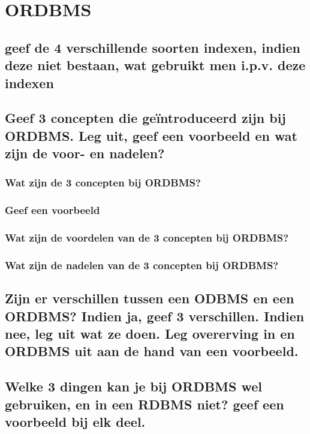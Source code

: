 \newpage

\section{ORDBMS}
\subsection{geef de 4 verschillende soorten indexen, indien deze niet bestaan, wat gebruikt men i.p.v. deze indexen}

\subsection{Geef 3 concepten die geïntroduceerd zijn bij ORDBMS. Leg uit, geef een voorbeeld en wat zijn de voor- en nadelen?}

\subsubsection{Wat zijn de 3 concepten bij ORDBMS?}

\subsubsection{Geef een voorbeeld}

\subsubsection{Wat zijn de voordelen van de 3 concepten bij ORDBMS?}


\subsubsection{Wat zijn de nadelen van de 3 concepten bij ORDBMS?}


\subsection{Zijn er verschillen tussen een ODBMS en een ORDBMS? Indien ja, geef 3 verschillen. Indien nee, leg uit wat ze doen. Leg overerving in en ORDBMS uit aan de hand van een voorbeeld.}

\subsection{Welke 3 dingen kan je bij ORDBMS wel gebruiken, en in een RDBMS niet? geef een voorbeeld bij elk deel.}